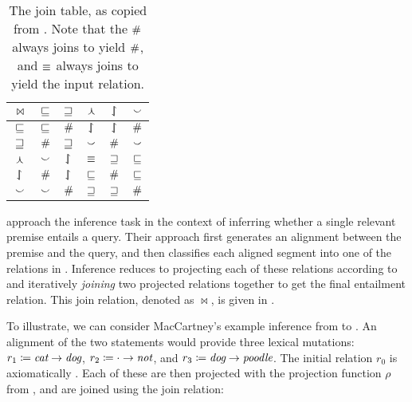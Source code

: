 %
%

\begin{table}[t]
	\begin{center}
	\begin{tabular}{|c||c|c|c|c|c|}
    \hline
    $\bowtie$ & $\sqsubseteq$ & $\sqsupseteq$ & $\curlywedge$ & $\downharpoonleft\hspace{-1.25mm}\upharpoonright$ & $\smallsmile$ \\
    \hline
    $\sqsubseteq$ & $\sqsubseteq$ & $\#$ & $\downharpoonleft\hspace{-1.25mm}\upharpoonright$ & $\downharpoonleft\hspace{-1.25mm}\upharpoonright$ & $\#$ \\
    $\sqsupseteq$ & $\#$ & $\sqsupseteq$ & $\smallsmile$ & $\#$ & $\smallsmile$ \\
    $\curlywedge$ & $\smallsmile$ & $\downharpoonleft\hspace{-1.25mm}\upharpoonright$ & $\equiv$ & $\sqsupseteq$ & $\sqsubseteq$ \\
    $\downharpoonleft\hspace{-1.25mm}\upharpoonright$ & $\#$ & $\downharpoonleft\hspace{-1.25mm}\upharpoonright$ & $\sqsubseteq$ & $\#$ & $\sqsubseteq$ \\
    $\smallsmile$ & $\smallsmile$ & $\#$ & $\sqsupseteq$ & $\sqsupseteq$ & $\#$ \\
    \hline
	\end{tabular}
	\caption{
    The join table, as copied from .
    Note that the $\#$ always joins to yield $\#$,
    and $\equiv$ always joins to yield the input relation.
		\label{tab:join}
	}
	\end{center}
\end{table}

 approach the inference task in
  the context of inferring whether a single relevant premise entails
  a query.
Their approach first generates an alignment between the premise
  and the query, and then classifies each aligned segment into one of
  the relations in .
Inference reduces to projecting each of these relations
  according to  and iteratively \textit{joining} 
  two projected relations together to get the final entailment
  relation.
This join relation, denoted as $\bowtie$, 
  is given in .

To illustrate, we can consider MacCartney's example inference from
   to .
An alignment of the two statements would provide three lexical
  mutations:
    \mbox{$r_1\coloneqq\textit{cat}\rightarrow\textit{dog}$}, 
    \mbox{$r_2\coloneqq\cdot\rightarrow\textit{not}$},
    and \mbox{$r_3\coloneqq\textit{dog}\rightarrow\textit{poodle}$}.
The initial relation $r_0$ is axiomatically \equivalent.
Each of these are then projected with the projection function $\rho$
  from ,
  and are joined using the join relation:

